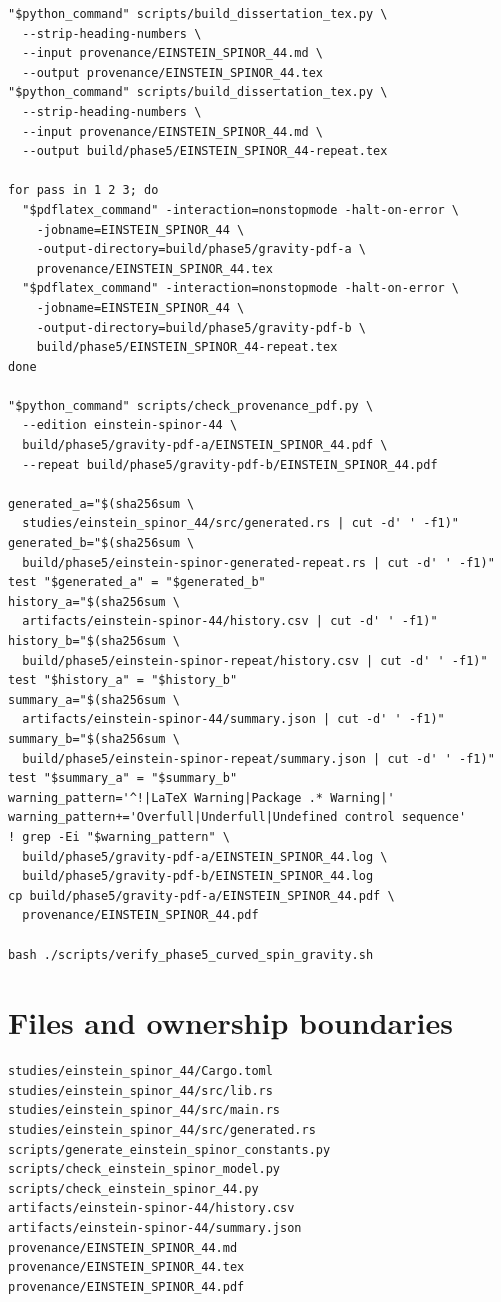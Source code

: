 \documentclass[11pt]{article}
\begin{document}
\begin{Verbatim}[fontsize=\small]
"$python_command" scripts/build_dissertation_tex.py \
  --strip-heading-numbers \
  --input provenance/EINSTEIN_SPINOR_44.md \
  --output provenance/EINSTEIN_SPINOR_44.tex
"$python_command" scripts/build_dissertation_tex.py \
  --strip-heading-numbers \
  --input provenance/EINSTEIN_SPINOR_44.md \
  --output build/phase5/EINSTEIN_SPINOR_44-repeat.tex

for pass in 1 2 3; do
  "$pdflatex_command" -interaction=nonstopmode -halt-on-error \
    -jobname=EINSTEIN_SPINOR_44 \
    -output-directory=build/phase5/gravity-pdf-a \
    provenance/EINSTEIN_SPINOR_44.tex
  "$pdflatex_command" -interaction=nonstopmode -halt-on-error \
    -jobname=EINSTEIN_SPINOR_44 \
    -output-directory=build/phase5/gravity-pdf-b \
    build/phase5/EINSTEIN_SPINOR_44-repeat.tex
done

"$python_command" scripts/check_provenance_pdf.py \
  --edition einstein-spinor-44 \
  build/phase5/gravity-pdf-a/EINSTEIN_SPINOR_44.pdf \
  --repeat build/phase5/gravity-pdf-b/EINSTEIN_SPINOR_44.pdf

generated_a="$(sha256sum \
  studies/einstein_spinor_44/src/generated.rs | cut -d' ' -f1)"
generated_b="$(sha256sum \
  build/phase5/einstein-spinor-generated-repeat.rs | cut -d' ' -f1)"
test "$generated_a" = "$generated_b"
history_a="$(sha256sum \
  artifacts/einstein-spinor-44/history.csv | cut -d' ' -f1)"
history_b="$(sha256sum \
  build/phase5/einstein-spinor-repeat/history.csv | cut -d' ' -f1)"
test "$history_a" = "$history_b"
summary_a="$(sha256sum \
  artifacts/einstein-spinor-44/summary.json | cut -d' ' -f1)"
summary_b="$(sha256sum \
  build/phase5/einstein-spinor-repeat/summary.json | cut -d' ' -f1)"
test "$summary_a" = "$summary_b"
warning_pattern='^!|LaTeX Warning|Package .* Warning|'
warning_pattern+='Overfull|Underfull|Undefined control sequence'
! grep -Ei "$warning_pattern" \
  build/phase5/gravity-pdf-a/EINSTEIN_SPINOR_44.log \
  build/phase5/gravity-pdf-b/EINSTEIN_SPINOR_44.log
cp build/phase5/gravity-pdf-a/EINSTEIN_SPINOR_44.pdf \
  provenance/EINSTEIN_SPINOR_44.pdf

bash ./scripts/verify_phase5_curved_spin_gravity.sh
\end{Verbatim}

\section{Files and ownership boundaries}

\begin{Verbatim}[fontsize=\small]
studies/einstein_spinor_44/Cargo.toml
studies/einstein_spinor_44/src/lib.rs
studies/einstein_spinor_44/src/main.rs
studies/einstein_spinor_44/src/generated.rs
scripts/generate_einstein_spinor_constants.py
scripts/check_einstein_spinor_model.py
scripts/check_einstein_spinor_44.py
artifacts/einstein-spinor-44/history.csv
artifacts/einstein-spinor-44/summary.json
provenance/EINSTEIN_SPINOR_44.md
provenance/EINSTEIN_SPINOR_44.tex
provenance/EINSTEIN_SPINOR_44.pdf
\end{Verbatim}
\end{document}
